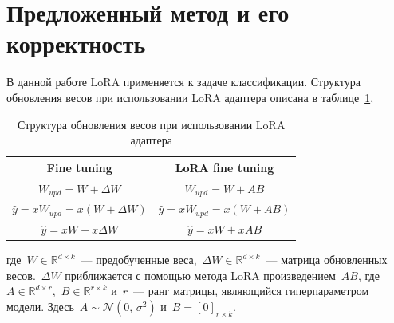 \newpage

\section{Предложенный метод и его корректность}
В данной работе LoRA применяется к задаче классификации. Структура обновления весов при использовании LoRA адаптера описана в таблице~\ref{table:1},
\begin{table}[ht!]
    \centering
\begin{tabular}{ | c | c| } 
 \hline
  Fine tuning & LoRA fine tuning\\ 
 \hline
 $W_{upd} = W + \Delta W$ & $W_{upd} = W + AB$\\ 
 $\hat{y} = xW_{upd}= x(W + \Delta W)$ & $\hat{y} = xW_{upd}= x(W + AB)$\\
 $\hat{y} = xW + x\Delta W$ & $\hat{y} = xW + xAB$ \\
 \hline
\end{tabular}
    \caption{Структура обновления весов при использовании LoRA адаптера}
    \label{table:1}
\end{table}

где~$W \in \mathbb{R}^{d \times k}$~--- предобученные веса,~$\Delta W \in \mathbb{R}^{d \times k}$~--- матрица обновленных весов.~$\Delta W$ приближается с помощью метода LoRA произведением~$AB$, где~$A \in \mathbb{R}^{d \times r}$,~$B \in \mathbb{R}^{r \times k}$ и~$r$~--- ранг матрицы, являющийся гиперпараметром модели. Здесь~$A \sim \mathcal{N}(0,\,\sigma^{2})$ и~$B = [0]_{r \times k}$. 

